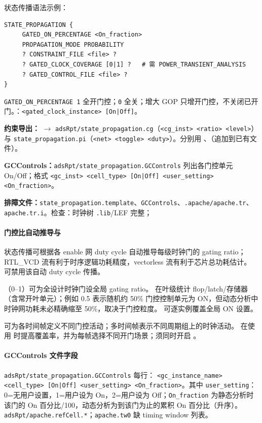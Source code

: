 状态传播语法示例：
\begin{lstlisting}
STATE_PROPAGATION {
     GATED_ON_PERCENTAGE <On_fraction>
     PROPAGATION_MODE PROBABILITY
     ? CONSTRAINT_FILE <file> ?
     ? GATED_CLOCK_COVERAGE [0|1] ?   # 需 POWER_TRANSIENT_ANALYSIS
     ? GATED_CONTROL_FILE <file> ?
}
\end{lstlisting}

\texttt{GATED\_ON\_PERCENTAGE 1} 全开门控；\texttt{0} 全关；增大 GOP 只增开门控，不关闭已开门。：\texttt{<gated\_clock\_instance> [On|Off]}。

\textbf{约束导出：} $\rightarrow$ \texttt{adsRpt/state\_propagation.cg}（\texttt{<cg\_inst> <ratio> <level>}）与 \texttt{state\_propagation.pi}（\texttt{<net> <toggle> <duty>}）。分别用 、（追加到已有文件）。

\textbf{GCControls：}\texttt{adsRpt/state\_propagation.GCControls} 列出各门控单元 On/Off；格式 \texttt{<gc\_inst> <cell\_type> [On|Off] <user\_setting> <On\_fraction>}。

\textbf{排障文件：}\texttt{state\_propagation.template}、\texttt{GCControls}、\texttt{.apache/apache.tr}、\texttt{apache.tr.i}。检查：时钟树 \texttt{.lib}/LEF 完整；
\paragraph{门控比自动推导与 }
状态传播可根据各 enable 网 duty cycle 自动推导每级时钟门的 gating ratio；RTL\_VCD 流有利于时序逻辑功耗精度，vectorless 流有利于芯片总功耗估计。 可禁用该自动 duty cycle 传播。

（0--1）可为全设计时钟门设全局 gating ratio。 在叶级统计 flop/latch/存储器（含常开叶单元）；例如 0.5 表示随机约 50\% 门控控制单元为 ON，但动态分析中时钟网功耗未必精确缩至 50\%，取决于门控粒度。 可逐实例覆盖全局 ON 设置。

 可为各时间帧定义不同门控活动；多时间帧表示不同周期组上的时钟活动。 在使用  时提高覆盖率，并为每帧选择不同开门场景；须同时开启 。

\paragraph{GCControls 文件字段}
\texttt{adsRpt/state\_propagation.GCControls} 每行：
\texttt{<gc\_instance\_name> <cell\_type> [On|Off] <user\_setting> <On\_fraction>}。其中 \texttt{user\_setting}：0=无用户设置，1=用户设为 On，2=用户设为 Off；\texttt{On\_fraction} 为静态分析时该门的 On 百分比/100，动态分析为到该门为止的累积 On 百分比（升序）。
\texttt{adsRpt/apache.refCell.*}；\texttt{apache.tw0} 缺 timing window 列表。

